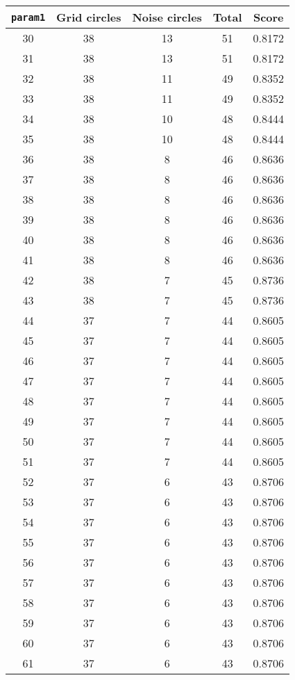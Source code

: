 \documentclass[letterpaper, 12pt]{article}
\begin{document}
\begin{longtable}{|c|c|c|c|c|}
\hline
\textbf{\texttt{param1}} & \textbf{Grid circles} & \textbf{Noise circles} & \textbf{Total} & \textbf{Score} \\
\hline
30 & 38 & 13 & 51 & 0.8172 \\
\hline
31 & 38 & 13 & 51 & 0.8172 \\
\hline
32 & 38 & 11 & 49 & 0.8352 \\
\hline
33 & 38 & 11 & 49 & 0.8352 \\
\hline
34 & 38 & 10 & 48 & 0.8444 \\
\hline
35 & 38 & 10 & 48 & 0.8444 \\
\hline
36 & 38 & 8 & 46 & 0.8636 \\
\hline
37 & 38 & 8 & 46 & 0.8636 \\
\hline
38 & 38 & 8 & 46 & 0.8636 \\
\hline
39 & 38 & 8 & 46 & 0.8636 \\
\hline
40 & 38 & 8 & 46 & 0.8636 \\
\hline
41 & 38 & 8 & 46 & 0.8636 \\
\hline
42 & 38 & 7 & 45 & 0.8736 \\
\hline
43 & 38 & 7 & 45 & 0.8736 \\
\hline
44 & 37 & 7 & 44 & 0.8605 \\
\hline
45 & 37 & 7 & 44 & 0.8605 \\
\hline
46 & 37 & 7 & 44 & 0.8605 \\
\hline
47 & 37 & 7 & 44 & 0.8605 \\
\hline
48 & 37 & 7 & 44 & 0.8605 \\
\hline
49 & 37 & 7 & 44 & 0.8605 \\
\hline
50 & 37 & 7 & 44 & 0.8605 \\
\hline
51 & 37 & 7 & 44 & 0.8605 \\
\hline
52 & 37 & 6 & 43 & 0.8706 \\
\hline
53 & 37 & 6 & 43 & 0.8706 \\
\hline
54 & 37 & 6 & 43 & 0.8706 \\
\hline
55 & 37 & 6 & 43 & 0.8706 \\
\hline
56 & 37 & 6 & 43 & 0.8706 \\
\hline
57 & 37 & 6 & 43 & 0.8706 \\
\hline
58 & 37 & 6 & 43 & 0.8706 \\
\hline
59 & 37 & 6 & 43 & 0.8706 \\
\hline
60 & 37 & 6 & 43 & 0.8706 \\
\hline
61 & 37 & 6 & 43 & 0.8706 \\

\end{longtable}
\end{document}
